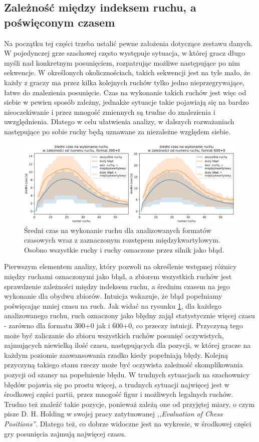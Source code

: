 \documentclass[inzynierska]{pwr_wmat_praca_dyplomowa}
\theoremstyle{plain}
\numberwithin{theorem}{chapter}
\theoremstyle{definition}
\numberwithin{theorem}{chapter}
\begin{document}
\subsection{Zależność między indeksem ruchu, a poświęconym czasem}


Na początku tej części trzeba ustalić pewne założenia dotyczące zestawu danych. W pojedynczej grze szachowej często występuje sytuacja, w której gracz długo myśli nad konkretnym posunięciem, rozpatrując możliwe następujące po nim sekwencje. W określonych okolicznościach, takich sekwencji jest na tyle mało, że każdy z graczy ma przez kilka kolejnych ruchów tylko jedno nieprzegrywające, łatwe do znalezienia posunięcie. Czas na wykonanie takich ruchów jest więc od siebie w pewien sposób zależny, jednakże sytuacje takie pojawiają się na bardzo nieoczekiwanie i przez mnogość zmiennych są trudne do znalezienia i uwzględnienia. Dlatego w celu ułatwienia analizy, w dalszych rozważaniach następujące po sobie ruchy będą uznawane za niezależne względem siebie.
\begin{figure}[H]
	\centering
	\includegraphics[width=\textwidth]{sr_czas_na_ruch.png}
	\caption{Średni czas na wykonanie ruchu dla analizowanych formatów czasowych wraz z zaznaczonym rozstępem międzykwartylowym. Osobno wszystkie ruchy i ruchy oznaczone przez silnik jako błąd.}
	\label{rys:sr_czas_na_ruch}
\end{figure}

Pierwszym elementem analizy, który pozwoli na określenie wstępnej różnicy między ruchami oznaczonymi jako błąd, a zbiorem wszystkich ruchów jest sprawdzenie zależności między indeksem ruchu, a średnim czasem na jego wykonanie dla obydwu zbiorów. Intuicja wskazuje, że błąd popełniamy poświęcając mniej czasu na ruch. Jak widać na rysunku \ref{rys:sr_czas_na_ruch}, dla każdego analizowanego ruchu, ruch oznaczony jako błędny zajął statystycznie więcej czasu - zarówno dla formatu 300+0 jak i 600+0, co przeczy intuicji. 
Przyczyną tego może być zaliczanie do zbioru wszystkich ruchów posunięć oczywistych, zajmujących niewielką ilość czasu, następujących dla pozycji, w której gracze na każdym poziomie zaawansowania rzadko kiedy popełniają błędy.
Kolejną przyczyną takiego stanu rzeczy może być oczywista zależność skomplikowania pozycji od szansy na popełnienie błędu. W trudnych sytuacjach na szachownicy błędów pojawia się po prostu więcej, a trudnych sytuacji najwięcej jest w środkowej części partii, przez mnogość figur i możliwych legalnych ruchów. Trudno też znaleźć takie pozycje, ponieważ zależą one od przyjętej miary, o czym pisze D. H. Holding w swojej pracy zatytuowanej \textit{,,Evaluation of Chess Positions''}\textbf{\cite{Holding1979TheEO}}.  Dlatego też, co dobrze widoczne jest na wykresie, w środkowej części gry posunięcia zajmują najwięcej czasu.
\end{document}
